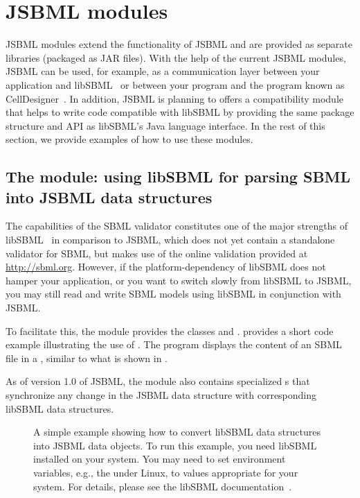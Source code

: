 
\section{JSBML modules}
\label{sec:jsbml-modules-details}

JSBML modules extend the functionality of JSBML and are provided as
separate libraries (packaged as JAR files). With the help of the current
JSBML modules, JSBML can be used, for example, as a communication layer
 between your application and
libSBML~\citep{Bornstein2008} or between your program and the program known
as CellDesigner~\citep{Funahashi2003}. In addition, JSBML is planning to offers a
compatibility module %
that helps to write code compatible with libSBML by providing the same package 
structure and API as libSBML's Java
language interface. In the rest of this section, we provide examples of how
to use these modules.


\subsection{The  module: using libSBML for parsing
  SBML into JSBML data structures}

The capabilities of the SBML validator constitutes one
of the major strengths of libSBML~\citep{Bornstein2008} in comparison to
JSBML, which does not yet contain a standalone validator for SBML, but makes
use of the online validation provided at \url{http://sbml.org}. However, if
the platform-dependency of libSBML does not hamper your application, or you
want to switch slowly from libSBML to JSBML, you may still read and write
SBML models using libSBML in conjunction with JSBML.

To facilitate this, the module  provides the classes
\LibSBMLReader and \LibSBMLWriter.   provides a short
code example illustrating the use of \LibSBMLReader.  The program displays the
content of an SBML file in a \JTree, similar to what is shown in
.

As of version 1.0 of JSBML, the  module also contains
specialized \TreeNodeChangeListener{}s that synchronize any change in the
JSBML data structure with corresponding libSBML data structures.

\begin{figure}[htb]
  
  \caption{A simple example showing how to convert libSBML data structures
    into JSBML data objects.  To run this example, you need libSBML
    installed on your system.  You may need to set environment variables,
    e.g., the 
    under Linux, to values appropriate for your
    system. For details, please see the libSBML
    documentation~\cite{libSBMLwebsite}.}
  \label{lst:LibSBMLio}
\end{figure}


